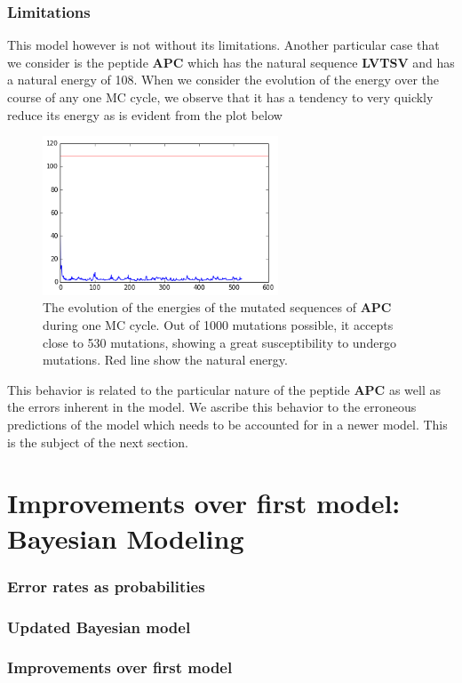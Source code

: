 \documentclass[a4paper, 12pt]{article}
\begin{document}
 	\section{Limitations}

 	This model however is not without its limitations. Another particular case that we consider is the peptide \textbf{APC} which has the natural sequence \textbf{LVTSV} and has a natural energy of 108. When we consider the evolution of the energy over the course of any one MC cycle, we observe that it has a tendency to very quickly reduce its energy as is evident from the plot below

 	\begin{figure}[!h]
 	\label{apc_evol}
 	\centering
 	\includegraphics[width=7cm]{Images/apc_evol.png} 
 	\caption{The evolution of the energies of the mutated sequences of \textbf{APC} during one MC cycle. Out of 1000 mutations possible, it accepts close to 530 mutations, showing a great susceptibility to undergo mutations. Red line show the natural energy.}
 	\end{figure} 

 	This behavior is related to the particular nature of the peptide \textbf{APC} as well as the errors inherent in the model. We ascribe this behavior to the erroneous predictions of the model which needs to be accounted for in a newer model. This is the subject of the next section. 
\part{Improvements over first model: Bayesian Modeling}
	\section{Error rates as probabilities}
	\section{Updated Bayesian model}
	\section{Improvements over first model}
\end{document}
